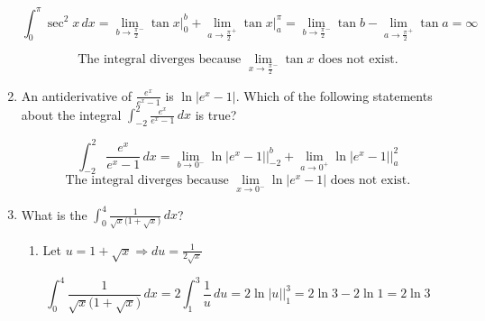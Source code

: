 \documentclass[12pt]{article}
\begin{document}
\begin{enumerate}
$$\int_{0}^{\pi} \sec^2 x \, dx = \lim_{b\to \frac{\pi}{2}^-} \tan x \bigg\rvert_{0}^{b} + \lim_{a\to \frac{\pi}{2}^+} \tan x \bigg\rvert_{a}^{\pi} = \lim_{b\to \frac{\pi}{2}^-} \tan b - \lim_{a\to \frac{\pi}{2}^+} \tan a = \infty$$

$$\boxed{\text{The integral diverges because } \lim_{x\to \frac{\pi}{2}^-} \tan x \text{ does not exist.}}$$
\item An antiderivative of $\frac{e^x}{e^x-1}$ is $\ln|e^x-1|$. Which of the following statements about the integral $\int_{-2}^{2} \frac{e^x}{e^x-1} \, dx$ is true?

$$\int_{-2}^{2} \frac{e^x}{e^x-1} \, dx = \lim_{b\to 0^-} \ln|e^x-1|\biggr\rvert_{-2}^{b} + \lim_{a\to 0^+} \ln|e^x-1|\biggr\rvert_{a}^{2}$$
$$\boxed{\text{The integral diverges because } \lim_{x\to 0^-} \ln|e^x-1| \text{ does not exist.}}$$
\item What is the $\int_{0}^{4} \frac{1}{\sqrt{x}\big(1+\sqrt{x}\big)}\, dx$?
\begin{enumerate}
    \item Let $u=1+\sqrt{x} \Longrightarrow du= \frac{1}{2\sqrt{x}}$
\end{enumerate}
$$\int_{0}^{4} \frac{1}{\sqrt{x}\big(1+\sqrt{x}\big)}\, dx=2\int_{1}^{3} \frac{1}{u}\,du=2\ln|u|\biggr\rvert_{1}^{3} =2\ln 3-2\ln 1 = \boxed{2\ln 3}$$


\end{enumerate}
\end{document}
